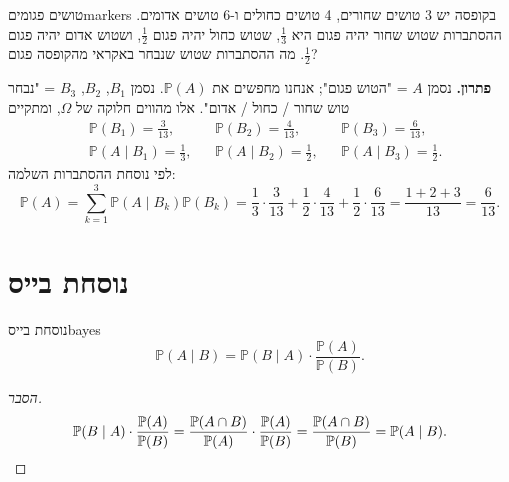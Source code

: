 \documentclass[11pt,a4paper]{report}
\newcommand{\flag}{\tikz[baseline=-0.1ex,x=0.9ex,y=0.9ex]{\draw[line width=0.5pt] (0,-0.3)--(0,1.6); \fill (0,1.6)--(1.2,1.2)--(0,0.8)--cycle;}}
\newcounter{todo}
\newcommand{\addtodo}[1]{\refstepcounter{todo}%
  \addcontentsline{tdo}{todo}{\protect\numberline{\thetodo}#1}}
\newcommand{\needcheck}[1]{\addtodo{#1}%
  {\color{todoc}\sffamily\small\,[\textbf{\flag{}\,\thetodo\ לבדיקה:} #1]\,}}
\renewcommand{\needcheck}[1]{}
\newcommand{\PP}{\mathbb{P}}
\begin{document}
\begin{center}
\end{center}

\begin{example}{טושים פגומים}{markers}
בקופסה יש 3 טושים שחורים, 4 טושים כחולים ו-6 טושים אדומים. ההסתברות שטוש שחור יהיה פגום היא $\frac13$, שטוש כחול יהיה פגום $\frac12$, ושטוש אדום יהיה פגום $\frac12$. מה ההסתברות שטוש שנבחר באקראי מהקופסה פגום?

\textbf{פתרון.} נסמן $A$ = "הטוש פגום"; אנחנו מחפשים את $\PP(A)$. נסמן $B_1$, $B_2$, $B_3$ = "נבחר טוש שחור / כחול / אדום". אלו מהווים חלוקה של $\Omega$, ומתקיים
\[
\begin{aligned}
  &\PP(B_1)=\tfrac3{13}, && \PP(B_2)=\tfrac4{13}, && \PP(B_3)=\tfrac6{13},\\
  &\PP(A\mid B_1)=\tfrac13, && \PP(A\mid B_2)=\tfrac12, && \PP(A\mid B_3)=\tfrac12.
\end{aligned}
\]
לפי נוסחת ההסתברות השלמה:
\[
  \PP(A)=\sum_{k=1}^3\PP(A\mid B_k)\PP(B_k)=\frac13\cdot\frac3{13}+\frac12\cdot\frac4{13}+\frac12\cdot\frac6{13}=\frac{1+2+3}{13}=\frac6{13}.
\]
\needcheck{ברשימות החישוב נעצר לפני התוצאה הסופית; השלמתי $\frac{6}{13}$}
\end{example}

\section{נוסחת בייס}

\begin{theorem}{נוסחת בייס}{bayes}
\[
  \PP(A\mid B)=\PP(B\mid A)\cdot\frac{\PP(A)}{\PP(B)}.
\]
\end{theorem}
\begin{proof}[הסבר]
\[
  \PP(B\mid A)\cdot\frac{\PP(A)}{\PP(B)}=\frac{\PP(A\cap B)}{\PP(A)}\cdot\frac{\PP(A)}{\PP(B)}=\frac{\PP(A\cap B)}{\PP(B)}=\PP(A\mid B).\qedhere
\]
\end{proof}
\end{document}

